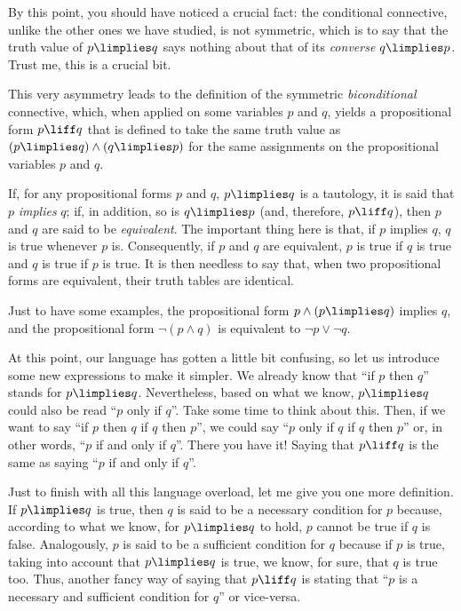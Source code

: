 \begin{para}
By this point, you should have noticed a crucial fact: the conditional connective, unlike the other ones we have studied, is not symmetric, which is to say that the truth value of $p\limplies q$ says nothing about that of its \emph{converse} $q\limplies p$.
Trust me, this is a crucial bit.

This very asymmetry leads to the definition of the symmetric \emph{biconditional} connective, which, when applied on some variables $p$ and $q$, yields a propositional form $p\liff q$ that is defined to take the same truth value as $(p\limplies q)\land(q\limplies p)$ for the same assignments on the propositional variables $p$ and $q$.
\end{para}

\begin{para}
If, for any propositional forms $p$ and $q$, $p\limplies q$ is a tautology, it is said that $p$ \emph{implies} $q$; if, in addition, so is $q\limplies p$ (and, therefore, $p\liff q$), then $p$ and $q$ are said to be \emph{equivalent}.
The important thing here is that, if $p$ implies $q$, $q$ is true whenever $p$ is. Consequently, if $p$ and $q$ are equivalent, $p$ is true if $q$ is true and $q$ is true if $p$ is true.
It is then needless to say that, when two propositional forms are equivalent, their truth tables are identical.

Just to have some examples, the propositional form $p\land (p\limplies q)$ implies $q$, and the propositional form $\lnot(p\land q)$ is equivalent to $\lnot p \lor \lnot q$.
\end{para}

\begin{para}
At this point, our language has gotten a little bit confusing, so let us introduce some new expressions to make it simpler. We already know that ``if $p$ then $q$'' stands for $p\limplies q$. Nevertheless, based on what we know, $p\limplies q$ could also be read ``$p$ only if $q$''. Take some time to think about this.
Then, if we want to say ``if $p$ then $q$  if $q$ then $p$'', we could say ``$p$ only if $q$  if $q$ then $p$'' or, in other words, ``$p$ if and only if $q$''. There you have it! Saying that $p\liff q$ is the same as saying ``$p$ if and only if $q$''.

Just to finish with all this language overload, let me give you one more definition. If $p\limplies q$ is true, then $q$ is said to be a necessary condition for $p$ because, according to what we know, for $p\limplies q$ to hold, $p$ cannot be true if $q$ is false. Analogously, $p$ is said to be a sufficient condition for $q$ because if $p$ is true, taking into account that $p\limplies q$ is true, we know, for sure, that $q$ is true too.
Thus, another fancy way of saying that $p\liff q$ is stating that ``$p$ is a necessary and sufficient condition for $q$'' or vice-versa. 
\end{para}

